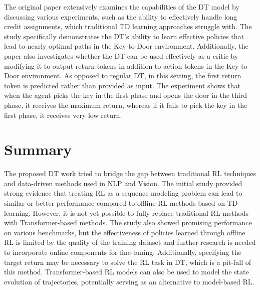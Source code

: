 \documentclass[conference]{IEEEtran}
\begin{document}
The original paper\cite{b1} extensively examines the capabilities of the DT model by discussing various experiments, such as the ability to effectively handle long credit assignments, which traditional TD learning approaches struggle with. The study specifically demonstrates the DT's ability to learn effective policies that lead to nearly optimal paths in the Key-to-Door environment. Additionally, the paper also investigates whether the DT can be used effectively as a critic by modifying it to output return tokens in addition to action tokens in the Key-to-Door environment. As opposed to regular DT, in this setting, the first return token is predicted rather than provided as input. The experiment shows that when the agent picks the key in the first phase and opens the door in the third phase, it receives the maximum return, whereas if it fails to pick the key in the first phase, it receives very low return.
\section{Summary}
The proposed DT work tried to bridge the gap between traditional RL techniques and data-driven methods used in NLP and Vision. The initial study provided strong evidence that treating RL as a sequence modeling problem can lead to similar or better performance compared to offline RL methods based on TD-learning. However, it is not yet possible to fully replace traditional RL methods with Transformer-based methods. The study also showed promising performance on various benchmarks, but the effectiveness of policies learned through offline RL is limited by the quality of the training dataset and further research is needed to incorporate online components for fine-tuning. Additionally, specifying the target return may be necessary to solve the RL task in DT, which is a pit-fall of this method. Transformer-based RL models can also be used to model the state evolution of trajectories, potentially serving as an alternative to model-based RL.
\end{document}
